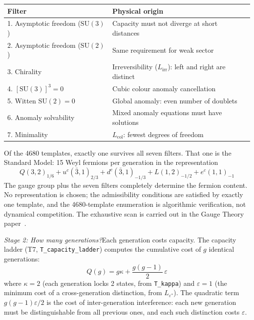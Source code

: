\documentclass[11pt]{article}
\newcommand{\SU}{\mathrm{SU}}
\begin{document}
\smallskip
\begin{center}
\small
\begin{tabular}{ll}
\toprule
\textbf{Filter} & \textbf{Physical origin} \\
\midrule
1. Asymptotic freedom ($\SU(3)$) & Capacity must not diverge at short distances \\
2. Asymptotic freedom ($\SU(2)$) & Same requirement for weak sector \\
3. Chirality & Irreversibility ($L_{\mathrm{irr}}$): left and right are distinct \\
4. $[\SU(3)]^3 = 0$ & Cubic colour anomaly cancellation \\
5. Witten $\SU(2) = 0$ & Global anomaly: even number of doublets \\
6. Anomaly solvability & Mixed anomaly equations must have solutions \\
7. Minimality & $L_{\mathrm{col}}$: fewest degrees of freedom \\
\bottomrule
\end{tabular}
\end{center}
\smallskip

Of the 4680 templates, exactly one survives all seven filters.  That one is the Standard Model: 15 Weyl fermions per generation in the representation
\begin{equation}
Q(3,2)_{1/6} + u^c(\bar{3},1)_{2/3} + d^c(\bar{3},1)_{-1/3} + L(1,2)_{-1/2} + e^c(1,1)_{-1}
\end{equation}
The gauge group plus the seven filters completely determine the fermion content.  No representation is chosen; the admissibility conditions are satisfied by exactly one template, and the 4680-template enumeration is algorithmic verification, not dynamical competition.  The exhaustive scan is carried out in the Gauge Theory paper~\cite{PGT}.

\textit{Stage 2: How many generations?}\quad Each generation costs capacity.  The capacity ladder (T7, \texttt{T\_capacity\_ladder}) computes the cumulative cost of $g$ identical generations:
\begin{equation}
Q(g) = g\kappa + \frac{g(g-1)}{2}\,\varepsilon
\end{equation}
where $\kappa = 2$ (each generation locks 2 states, from \texttt{T\_kappa}) and $\varepsilon = 1$ (the minimum cost of a cross-generation distinction, from $L_{\varepsilon^*}$).  The quadratic term $g(g-1)\varepsilon/2$ is the cost of inter-generation interference: each new generation must be distinguishable from all previous ones, and each such distinction costs $\varepsilon$.
\end{document}
